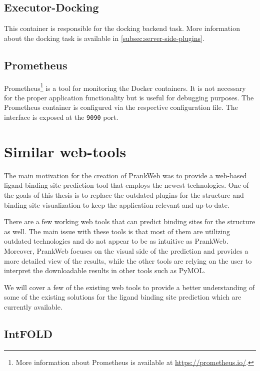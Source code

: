 \subsection{Executor-Docking}
\label{subsec:executor-docking}

This container is responsible for the docking backend task. More information about the docking task is available in \cref{subsec:server-side-plugins}.

\subsection{Prometheus}
\label{subsec:prometheus}

Prometheus\footnote{More information about Prometheus is available at \url{https://prometheus.io/}.} is a tool for monitoring the Docker containers. It is not necessary for the proper application functionality but is useful for debugging purposes. The Prometheus container is configured via the respective configuration file. The interface is exposed at the \texttt{9090} port.

\section{Similar web-tools}
\label{sec:similar_web_tools}

The main motivation for the creation of PrankWeb was to provide a web-based ligand binding site prediction tool that employs the newest technologies. One of the goals of this thesis is to replace the outdated plugins for the structure and binding site visualization to keep the application relevant and up-to-date.

There are a few working web tools that can predict binding sites for the structure as well. The main issue with these tools is that most of them are utilizing outdated technologies and do not appear to be as intuitive as PrankWeb\cite{jendele2019prankweb}. Moreover, PrankWeb focuses on the visual side of the prediction and provides a more detailed view of the results, while the other tools are relying on the user to interpret the downloadable results in other tools such as PyMOL.

We will cover a few of the existing web tools to provide a better understanding of some of the existing solutions for the ligand binding site prediction which are currently available.

\subsection{IntFOLD}
\label{subsec:intfold}

